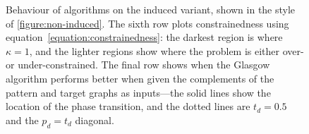 \documentclass[twoside,11pt]{article}
\begin{document}
\begin{figure}[p]
    \caption{Behaviour of algorithms on the induced variant, shown in the style
    of \cref{figure:non-induced}. The sixth row plots constrainedness using
    equation~\eqref{equation:constrainedness}: the
    darkest region is where $\kappa = 1$, and the lighter regions show where the problem is either
    over- or under-constrained. The final row shows when the Glasgow algorithm performs better when
    given the complements of the pattern and target graphs as inputs---the solid lines show the
    location of the phase transition, and the dotted lines are $t_d=0.5$ and the $p_d=t_d$
    diagonal.}\label{figure:induced}
\end{figure}
\end{document}
